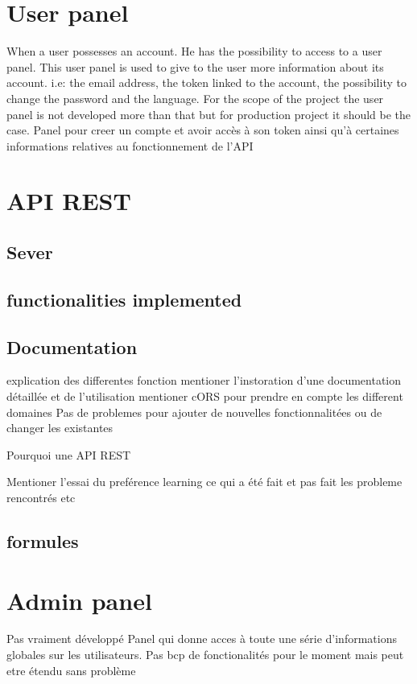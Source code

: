 \section{User panel}
When a user possesses an account. He has the possibility to access to a user panel. This user panel is used to give to the user more information about its account. i.e: the email address, the token linked to the account, the possibility to change the password and the language. For the scope of the project the user panel is not developed more than that but for production project it should be the case.
Panel pour creer un compte et avoir accès à son token ainsi qu'à certaines informations relatives au fonctionnement de l'API

\section{API REST}
\subsection{Sever}
\subsection{functionalities implemented}
\subsection{Documentation}
explication des differentes fonction
 mentioner l'instoration d'une documentation détaillée et de l'utilisation 
 mentioner cORS pour prendre en compte les different domaines
 Pas de problemes pour ajouter de nouvelles fonctionnalitées ou de changer les existantes
 
 Pourquoi une API REST
 
 Mentioner l'essai du preférence learning ce qui a été fait et pas fait les probleme rencontrés etc
 \subsection{formules}

\section{Admin panel}
Pas vraiment développé
Panel qui donne acces à toute une série d'informations globales sur les utilisateurs. Pas bcp de fonctionalités pour le moment mais peut etre étendu sans problème

